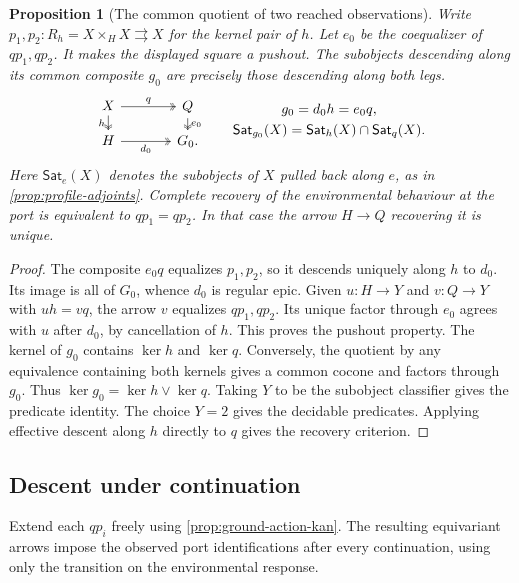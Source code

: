 \documentclass[11pt,a4paper]{article}
\newtheorem{proposition}[proposition]{Proposition}
\theoremstyle{definition}
\theoremstyle{remark}\newaliascnt{remark}{theorem}
\numberwithin{equation}{section}
\begin{document}
\begin{proposition}[The common quotient of two reached observations]\label{thm:ground-common}
Write $p_1,p_2:R_h=X\times_H X\rightrightarrows X$ for the kernel pair of $h$. Let $e_0$ be the coequalizer of $qp_1,qp_2$. It makes the displayed square a pushout. The subobjects descending along its common composite $g_0$ are precisely those descending along both legs.
\[
\begin{tikzcd}[column sep=large,row sep=small]
 X\arrow[r,two heads,"q"]\arrow[d,two heads,"h"']&
 Q\arrow[d,two heads,"e_0"]\\
 H\arrow[r,two heads,"d_0"']&G_0 .
\end{tikzcd}
\qquad
\begin{gathered}
 g_0=d_0h=e_0q,\\
 \mathsf{Sat}_{g_0}(X)=
 \mathsf{Sat}_h(X)\cap\mathsf{Sat}_q(X).
\end{gathered}
\]
Here $\mathsf{Sat}_e(X)$ denotes the subobjects of $X$ pulled back along $e$, as in \cref{prop:profile-adjoints}. Complete recovery of the environmental behaviour at the port is equivalent to $qp_1=qp_2$. In that case the arrow $H\to Q$ recovering it is unique.
\end{proposition}
\begin{proof}
The composite $e_0q$ equalizes $p_1,p_2$, so it descends uniquely along $h$ to $d_0$. Its image is all of $G_0$, whence $d_0$ is regular epic. Given $u:H\to Y$ and $v:Q\to Y$ with $uh=vq$, the arrow $v$ equalizes $qp_1,qp_2$. Its unique factor through $e_0$ agrees with $u$ after $d_0$, by cancellation of $h$. This proves the pushout property. The kernel of $g_0$ contains $\ker h$ and $\ker q$. Conversely, the quotient by any equivalence containing both kernels gives a common cocone and factors through $g_0$. Thus $\ker g_0=\ker h\vee\ker q$. Taking $Y$ to be the subobject classifier gives the predicate identity. The choice $Y=2$ gives the decidable predicates. Applying effective descent along $h$ directly to $q$ gives the recovery criterion.
\end{proof}

\subsection{Descent under continuation}
Extend each \(qp_i\) freely using \cref{prop:ground-action-kan}. The resulting equivariant arrows impose the observed port identifications after every continuation, using only the transition on the environmental response.
\end{document}
